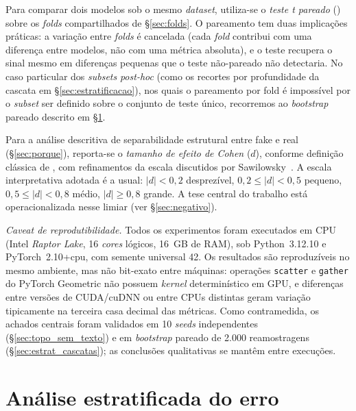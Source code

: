 Para comparar dois modelos sob o mesmo \emph{dataset}, utiliza-se o
\emph{teste t pareado} () sobre os
\emph{folds} compartilhados de \S\ref{sec:folds}. O pareamento tem
duas implica\c{c}\~oes pr\'aticas: a varia\c{c}\~ao entre \emph{folds}
\'e cancelada (cada \emph{fold} contribui com uma diferen\c{c}a entre
modelos, n\~ao com uma m\'etrica absoluta), e o teste recupera o sinal
mesmo em diferen\c{c}as pequenas que o teste n\~ao-pareado n\~ao
detectaria. No caso particular dos \emph{subsets} \emph{post-hoc} (como
os recortes por profundidade da cascata em \S\ref{sec:estratificacao}),
nos quais o pareamento por fold \'e imposs\'ivel por o \emph{subset} ser
definido sobre o conjunto de teste \'unico, recorremos ao \emph{bootstrap}
pareado descrito em \S\ref{sec:metod_estratificacao}.

Para a an\'alise descritiva de separabilidade estrutural entre fake e
real (\S\ref{sec:porque}), reporta-se o \emph{tamanho de efeito de Cohen}
($d$), conforme defini\c{c}\~ao cl\'assica de
\cite{cohen1988statistical}, com refinamentos da escala discutidos por
Sawilowsky~\cite{sawilowsky2009effect}. A escala interpretativa adotada
\'e a usual: $|d| < 0{,}2$ desprez\'ivel, $0{,}2 \leq |d| < 0{,}5$
pequeno, $0{,}5 \leq |d| < 0{,}8$ m\'edio, $|d| \geq 0{,}8$ grande. A tese
central do trabalho est\'a operacionalizada nesse limiar (ver
\S\ref{sec:negativo}).

\textit{Caveat de reprodutibilidade.} Todos os experimentos foram
executados em CPU (Intel \emph{Raptor Lake}, 16 \emph{cores} l\'ogicos,
16~GB de RAM), sob Python~3.12.10 e PyTorch~2.10+cpu, com semente
universal 42. Os resultados s\~ao reproduz\'iveis no mesmo ambiente, mas
n\~ao bit-exato entre m\'aquinas: opera\c{c}\~oes \texttt{scatter} e
\texttt{gather} do PyTorch Geometric n\~ao possuem \emph{kernel}
determin\'istico em GPU, e diferen\c{c}as entre vers\~oes de CUDA/cuDNN
ou entre CPUs distintas geram varia\c{c}\~ao tipicamente na terceira casa
decimal das m\'etricas. Como contramedida, os achados centrais foram
validados em 10 \emph{seeds} independentes (\S\ref{sec:topo_sem_texto}) e
em \emph{bootstrap} pareado de 2.000 reamostragens
(\S\ref{sec:estrat_cascatas}); as conclus\~oes qualitativas se mant\^em
entre execu\c{c}\~oes.

\section{An\'alise estratificada do erro}
\label{sec:metod_estratificacao}

